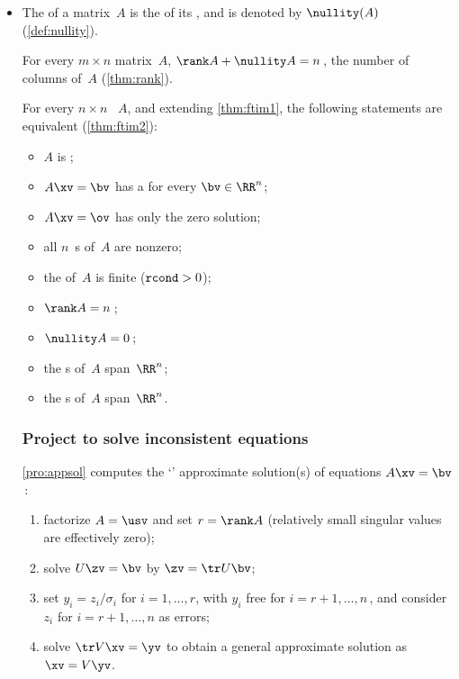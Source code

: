 \begin{itemize}
\item The  of a matrix~\(A\) is the  of its , and is denoted by \(\nullity(A)\) (\autoref{def:nullity}).

\itemhi For every \(m\times n\) matrix~\(A\),  \(\rank A+\nullity A=n\)\,, the number of columns of~\(A\) (\autoref{thm:rank}).

\itemme For every \(n\times n\) ~\(A\), and extending \autoref{thm:ftim1}, the following statements are equivalent (\autoref{thm:ftim2}):
\begin{itemize}
\item \(A\) is ;
\item \(A\xv=\bv\) has a  for every \(\bv\in\RR^n\);
\item {}\(A\xv=\ov\) has only the zero solution;
\item all \(n\)~s of~\(A\) are nonzero;
\item the  of~\(A\) is finite (\(\verb|rcond|>0\));
\item \(\rank A=n\)\,;
\item \(\nullity A=0\)\,;
\item the s of~\(A\) span~\(\RR^n\);
\item the s of~\(A\) span~\(\RR^n\).
\end{itemize}





\subsubsection{Project to solve inconsistent equations}

\itemhi \autoref{pro:appsol} computes the `' approximate solution(s) of  equations $A\xv=\bv$\,:
\begin{enumerate}
    \item factorize \(A=\usv\) and set \(r=\rank A\) (relatively small singular values are effectively zero);
        \item solve \(U\zv=\bv\) by $\zv=\tr U\bv$;
    
        \item  set $y_i=z_i/\sigma_i$ for $i=1,\ldots,r$, with $y_i$ free for $i=r+1,\ldots,n$\,, and consider \(z_i\) for \(i=r+1,\ldots,n\) as errors; 
    
        \item solve \(\tr V\xv=\yv\) to obtain a general approximate solution as $\xv=V\yv$.
\end{enumerate}


\end{itemize}
